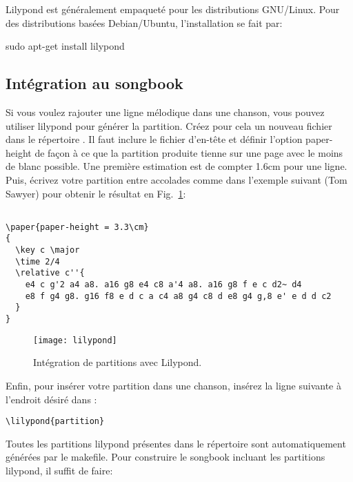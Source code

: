 \documentclass[versionenligne]{framabook}
\begin{document}
Lilypond est généralement empaqueté pour les distributions
GNU/Linux. Pour des distributions basées Debian/Ubuntu, l'installation
se fait par:

\begin{unixcom}
  sudo apt-get install lilypond
\end{unixcom}


\subsection{Intégration au songbook}

Si vous voulez rajouter une ligne mélodique dans une chanson, vous
pouvez utiliser lilypond pour générer la partition. Créez pour cela un
nouveau fichier  dans le répertoire .
Il faut inclure le fichier d'en-tête  et définir l'option
paper-height de façon à ce que la partition produite tienne sur une
page avec le moins de blanc possible. Une première estimation est de
compter 1.6cm pour une ligne. Puis, écrivez votre partition entre
accolades comme dans l'exemple suivant (Tom Sawyer) pour obtenir le
résultat en Fig.~\ref{fig:lilypond}:

\begin{verbatim}

\paper{paper-height = 3.3\cm}
{
  \key c \major
  \time 2/4
  \relative c''{
    e4 c g'2 a4 a8. a16 g8 e4 c8 a'4 a8. a16 g8 f e c d2~ d4
    e8 f g4 g8. g16 f8 e d c a c4 a8 g4 c8 d e8 g4 g,8 e' e d d c2
  }
}
\end{verbatim}

\begin{figure}
  \centering
  \texttt{[image: lilypond]}
  \caption{Intégration de partitions avec Lilypond.}
  \label{fig:lilypond}
\end{figure}

Enfin, pour insérer votre partition dans une chanson, insérez la ligne
suivante à l'endroit désiré dans :

\begin{verbatim}
\lilypond{partition}
\end{verbatim}

Toutes les partitions lilypond présentes dans le répertoire
 sont automatiquement générées par le
makefile. Pour construire le songbook incluant les partitions
lilypond, il suffit de faire:
\end{document}
